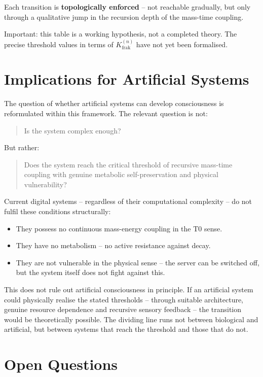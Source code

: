 	Each transition is \textbf{topologically enforced} -- not reachable gradually, but only through a qualitative jump in the recursion depth of the mass-time coupling.
	
	Important: this table is a working hypothesis, not a completed theory. The precise threshold values in terms of $K_{\text{frak}}^{(n)}$ have not yet been formalised.
	
	\section{Implications for Artificial Systems}
	
	The question of whether artificial systems can develop consciousness is reformulated within this framework. The relevant question is not:
	\begin{quote}
		Is the system complex enough?
	\end{quote}
	But rather:
	\begin{quote}
		Does the system reach the critical threshold of recursive mass-time coupling with genuine metabolic self-preservation and physical vulnerability?
	\end{quote}
	
	Current digital systems -- regardless of their computational complexity -- do not fulfil these conditions structurally:
	\begin{itemize}
		\item They possess no continuous mass-energy coupling in the T0 sense.
		\item They have no metabolism -- no active resistance against decay.
		\item They are not vulnerable in the physical sense -- the server can be switched off, but the system itself does not fight against this.
	\end{itemize}
	
	This does not rule out artificial consciousness in principle. If an artificial system could physically realise the stated thresholds -- through suitable architecture, genuine resource dependence and recursive sensory feedback -- the transition would be theoretically possible. The dividing line runs not between biological and artificial, but between systems that reach the threshold and those that do not.
	
	\section{Open Questions}
	

